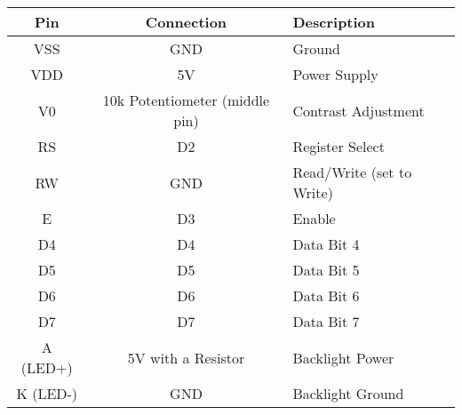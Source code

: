 \begin{table}[h!]
    \centering
    \renewcommand{\arraystretch}{1.3}
    \begin{tabular}{|c|c|l|}
        \hline
        \textbf{Pin} & \textbf{Connection} & \textbf{Description} \\
        \hline
        VSS  & GND & Ground \\
        VDD  & 5V  & Power Supply \\
        V0   & 10k Potentiometer (middle pin) & Contrast Adjustment \\
        RS   & D2  & Register Select \\
        RW   & GND & Read/Write (set to Write) \\
        E    & D3  & Enable \\
        D4   & D4  & Data Bit 4 \\
        D5   & D5  & Data Bit 5 \\
        D6   & D6  & Data Bit 6 \\
        D7   & D7  & Data Bit 7 \\
        A (LED+) & 5V with a Resistor & Backlight Power \\
        K (LED-) & GND & Backlight Ground \\
        \hline
    \end{tabular}
    \label{tab:lcd_pins}
\end{table}
